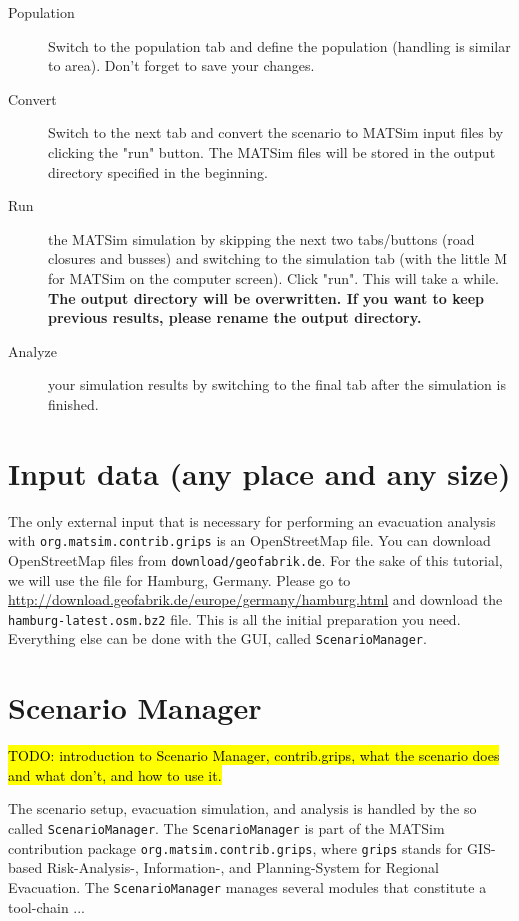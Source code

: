 \begin{description}
\item[Population] Switch to the population tab and define the population (handling is similar to area). Don't forget to save your changes.
\item[Convert] Switch to the next tab and convert the scenario to MATSim input files by clicking the "run" button. The MATSim files will be stored in the output directory specified in the beginning.
\item[Run] the MATSim simulation by skipping the next two tabs/buttons (road closures and busses) and switching to the simulation tab (with the little M for MATSim on the computer screen). Click "run". This will take a while.
\bf{The output directory will be overwritten. If you want to keep previous results, please rename the output directory.}
\item[Analyze] your simulation results by switching to the final tab after the simulation is finished.

\end{description}

\section{Input data (any place and any size)}
The only external input that is necessary for performing an evacuation analysis with \verb|org.matsim.contrib.grips| is an OpenStreetMap file.
You can download OpenStreetMap files from 
\verb+download/geofabrik.de+.
For the sake of this tutorial, we will use the file for Hamburg, Germany. 
Please go to \url{http://download.geofabrik.de/europe/germany/hamburg.html} and download the \verb+hamburg-latest.osm.bz2+ file. This is all the initial preparation you need. Everything else can 
be done with the GUI, called \verb+ScenarioManager+.

\section{Scenario Manager}
\hl{TODO: introduction to Scenario Manager, contrib.grips, what the scenario does and what don't, and how to use it.}

The scenario setup, evacuation simulation, and analysis is handled by the so called \verb+ScenarioManager+.
The \verb+ScenarioManager+ is part of the MATSim contribution package \verb+org.matsim.contrib.grips+, where \verb+grips+ stands for GIS-based Risk-Analysis-, Information-, and Planning-System for Regional Evacuation.
The \verb+ScenarioManager+ manages several modules that constitute a tool-chain ...


